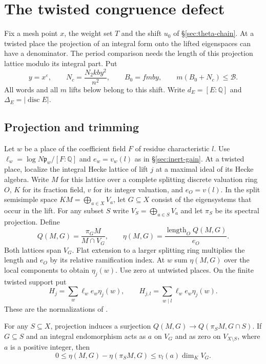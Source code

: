\section{The twisted congruence defect}\label{sec:twisted-defect}

Fix a mesh point $x$, the weight set $T$ and the shift $u_0$ of
\S\ref{sec:theta-chain}. At a twisted place the projection of an
integral form onto the lifted eigenspaces can have a denominator.
The period comparison needs the length of this projection lattice
modulo its integral part. Put
\[
 y=x^\varepsilon,\qquad N_c=\frac{N_2kby^2}{n^2},\qquad
 B_0=fmby,\qquad m(B_0+N_c)\le\mathcal B .
\]
All words and all $m$ lifts below belong to this shift. Write
$d_E=[E:\mathbb Q]$ and $\Delta_E=|\operatorname{disc}E|$.

\subsection{Projection and trimming}

Let $w$ be a place of the coefficient field $F$ of residue
characteristic $l$. Use $\ell_w=\log N\mathfrak p_w/[F:\mathbb Q]$
and $e_w=v_w(l)$ as in \S\ref{sec:inert-gain}. At a twisted place,
localize the integral Hecke lattice of lift $j$ at a maximal ideal of
its Hecke algebra. Write $M$ for this lattice over a complete splitting
discrete valuation ring $O$, $K$ for its fraction field, $v$ for its
integer valuation, and $e_O=v(l)$. In the split semisimple space
$KM=\bigoplus_{a\in X}V_a$, let $G\subseteq X$ consist of the
eigensystems that occur in the lift. For any subset $S$ write
$V_S=\bigoplus_{a\in S}V_a$ and let $\pi_S$ be its spectral projection.
Define
\[
 Q(M,G)=\frac{\pi_G M}{M\cap V_G},\qquad
 \eta(M,G)=\frac{\operatorname{length}_O Q(M,G)}{e_O}.
\]
Both lattices span $V_G$. Flat extension to a larger splitting ring
multiplies the length and $e_O$ by its relative ramification index.
At $w$ sum $\eta(M,G)$ over the local components to obtain $\eta_j(w)$.
Use zero at untwisted places. On the finite twisted support put
\begin{equation}\label{eq:twisted-sum}
 H_j=\sum_w\ell_we_w\eta_j(w),\qquad
 H_{j,l}=\sum_{w\mid l}\ell_we_w\eta_j(w).
\end{equation}
These are the normalizations of \citep[Definition~17.1]{adriazola-grh}.

\begin{lemma}\label{lem:twisted-trim}
For any $S\subseteq X$, projection induces a surjection
$Q(M,G)\to Q(\pi_S M,G\cap S)$. If $G\subseteq S$ and an integral
endomorphism acts as $a$ on $V_G$ and as zero on $V_{X\setminus S}$,
where $a$ is a positive integer, then
\[
 0\le\eta(M,G)-\eta(\pi_S M,G)\le v_l(a)\dim_K V_G .
\]
\end{lemma}

